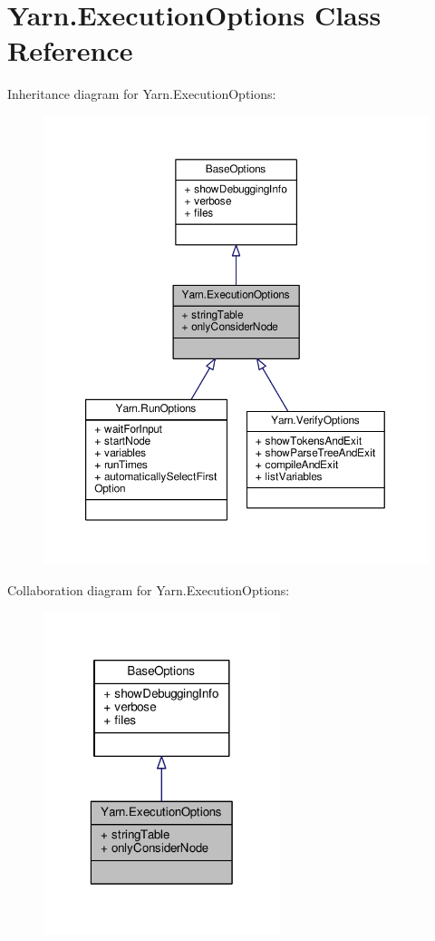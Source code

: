 \hypertarget{a00081}{\section{Yarn.\-Execution\-Options Class Reference}
\label{a00081}
}


Inheritance diagram for Yarn.\-Execution\-Options\-:
\nopagebreak
\begin{figure}[H]
\begin{center}
\leavevmode
\includegraphics[width=350pt]{dd/d6b/a00649}
\end{center}
\end{figure}


Collaboration diagram for Yarn.\-Execution\-Options\-:
\nopagebreak
\begin{figure}[H]
\begin{center}
\leavevmode
\includegraphics[width=196pt]{da/d36/a00650}
\end{center}
\end{figure}
